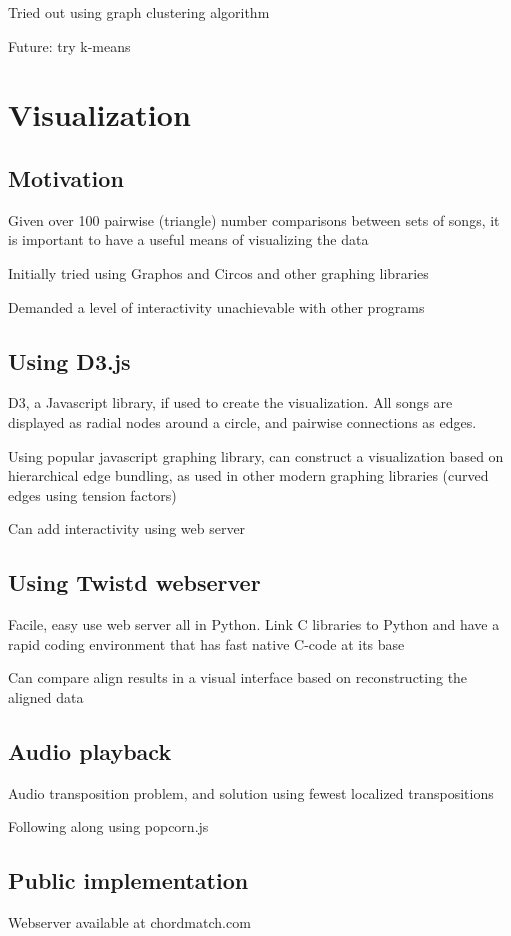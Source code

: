 \item Tried out using graph clustering algorithm

\item Future: try k-means

\section{Visualization}

\subsection{Motivation}

\item Given over 100 pairwise (triangle) number comparisons between sets of songs, it is important to have a useful means of visualizing the data

\item Initially tried using Graphos and Circos and other graphing libraries

\item Demanded a level of interactivity unachievable with other programs

\subsection{Using D3.js}

D3, a Javascript library, if used to create the visualization. All songs are displayed as radial nodes around a circle, and pairwise connections as edges.

\item Using popular javascript graphing library, can construct a visualization based on hierarchical edge bundling, as used in other modern graphing libraries (curved edges using tension factors)

\item Can add interactivity using web server

\subsection{Using Twistd webserver}

\item Facile, easy use web server all in Python. Link C libraries to Python and have a rapid coding environment that has fast native C-code at its base

\item Can compare align results in a visual interface based on reconstructing the aligned data

\subsection{Audio playback}

\item Audio transposition problem, and solution using fewest localized transpositions

\item Following along using popcorn.js

\subsection{Public implementation}

\item Webserver available at chordmatch.com